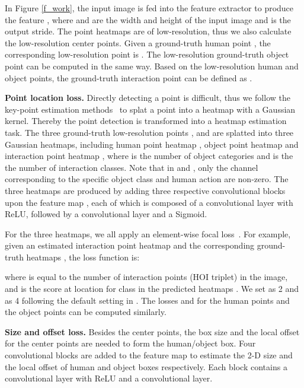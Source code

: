 \documentclass[10pt,twocolumn,letterpaper]{article}
\begin{document}
In Figure \ref{f_work}, the input image  is fed into the feature extractor to produce the feature , where  and  are the width and height of the input image and  is the output stride.
The point heatmaps are of low-resolution, thus we also calculate the low-resolution center points.
Given a ground-truth human point ,  the corresponding low-resolution point is  . The low-resolution ground-truth object point  can be computed in the same way. Based on the low-resolution human and object points, the ground-truth interaction point can be defined as . 


\textbf{Point location loss.} Directly detecting a point is difficult, thus we follow the key-point estimation methods~\cite{tompson2014joint} to splat a point into a heatmap with a Gaussian kernel. Thereby the point detection is transformed into a heatmap estimation task. 
The three  ground-truth low-resolution points ,  and  are splatted into three Gaussian heatmaps, including human point heatmap , object point heatmap  and interaction point heatmap , 
where  is the number of object categories and  is the the number of interaction classes. Note that in  and , 
only the channel corresponding to the specific object class and human action are non-zero.
The three heatmaps are produced by adding three  respective  convolutional blocks upon the feature map ,  each of which is composed of a  convolutional layer with ReLU, followed by a  convolutional layer and a Sigmoid.

 For the three heatmaps, we all apply an element-wise focal loss~\cite{lin2017focal}. For example,  given an estimated interaction point heatmap   and the corresponding ground-truth heatmaps , the loss function is:
\vspace{-2mm}

where  is equal to the number of interaction points (HOI triplet) in the image,  and   is  the score at location  for class  in the predicted heatmaps .  We set  as 2 and  as 4 following the default setting in \cite{law2018cornernet,zhou2019objects,Dong_2020_CVPR}. The losses  and  for the human points and the object points can be computed similarly.

\textbf{Size and offset loss.} 
Besides the  center points,  the box size and the local offset for the center points are needed to form the human/object box. 
Four convolutional blocks are added to the feature map  to estimate the 2-D size and the local offset of human and object boxes respectively. Each block contains a  convolutional layer with ReLU and a  convolutional layer. 
\end{document}
